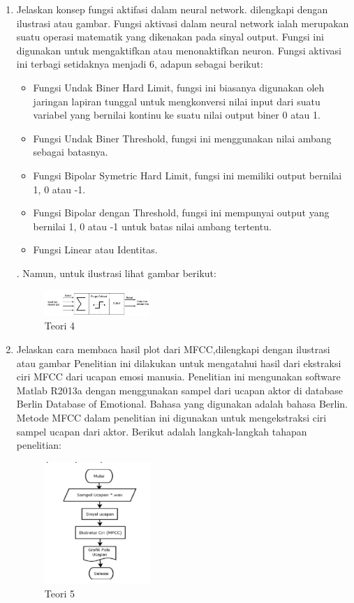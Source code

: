 \begin{enumerate}
	\item Jelaskan konsep fungsi aktifasi dalam neural network. dilengkapi dengan ilustrasi atau gambar.
	\hfill\break
	Fungsi aktivasi dalam neural network ialah merupakan suatu operasi matematik yang dikenakan pada sinyal output. Fungsi ini digunakan untuk mengaktifkan atau menonaktifkan neuron. Fungsi aktivasi ini terbagi setidaknya menjadi 6, adapun sebagai berikut:
	\begin{itemize}
	\item Fungsi Undak Biner Hard Limit, fungsi ini biasanya digunakan oleh jaringan lapiran tunggal untuk mengkonversi nilai input dari suatu variabel yang bernilai kontinu ke suatu nilai output biner 0 atau 1.
	\item Fungsi Undak Biner Threshold, fungsi ini menggunakan nilai ambang sebagai batasnya.
	\item Fungsi Bipolar Symetric Hard Limit, fungsi ini memiliki output bernilai 1, 0 atau -1.
	\item Fungsi Bipolar dengan Threshold, fungsi ini mempunyai output yang bernilai 1, 0 atau -1 untuk batas nilai ambang tertentu.
	\item Fungsi Linear atau Identitas.
	\end{itemize}. 
	Namun, untuk ilustrasi lihat gambar berikut: 

	\begin{figure}[H]
	\centering
		\includegraphics[width=4cm]{figures/1174080/6/materi/teori4.PNG}
		\caption{Teori 4}
	\end{figure}

	\item Jelaskan cara membaca hasil plot dari MFCC,dilengkapi dengan ilustrasi atau gambar
	\hfill\break
	Penelitian ini dilakukan untuk mengatahui  hasil dari ekstraksi ciri MFCC dari ucapan emosi manusia. Penelitian ini mengunakan software Matlab R2013a dengan menggunakan sampel dari ucapan aktor di database Berlin Database of Emotional. Bahasa yang digunakan adalah bahasa Berlin. Metode MFCC dalam penelitian ini digunakan untuk mengekstraksi ciri sampel ucapan dari aktor. Berikut adalah langkah-langkah tahapan penelitian:

	\begin{figure}[H]
	\centering
		\includegraphics[width=4cm]{figures/1174080/6/materi/teori5.PNG}
		\caption{Teori 5}
	\end{figure}


\end{enumerate}
